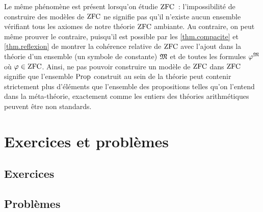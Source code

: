 Le même phénomène est présent lorsqu'on étudie $\operatorname{ZFC}$~: l'impossibilité de
construire des modèles de $\operatorname{ZFC}$ ne signifie pas qu'il n'existe aucun ensemble
vérifiant tous les axiomes de notre théorie $\operatorname{ZFC}$ ambiante. Au contraire, on
peut même prouver le contraire, puisqu'il est possible par les
\cref{thm.compacite} et \cref{thm.reflexion} de montrer la cohérence relative
de $\operatorname{ZFC}$ avec l'ajout dans la théorie d'un ensemble (un symbole de constante)
$\mathfrak{M}$ et de toutes les formules $\varphi^{\mathfrak{M}}$ où $\varphi \in \operatorname{ZFC}$.
Ainsi, ne pas pouvoir construire un modèle de $\operatorname{ZFC}$ dans $\operatorname{ZFC}$ signifie que
l'ensemble $\operatorname{Prop}$ construit au sein de la théorie peut contenir strictement
plus d'éléments que l'ensemble des propositions telles qu'on l'entend dans la
méta-théorie, exactement comme les entiers des théories arithmétiques peuvent
être non standards.

\clearpage

\section{Exercices et problèmes}

\subsection{Exercices}

\clearpage

\subsection{Problèmes}
